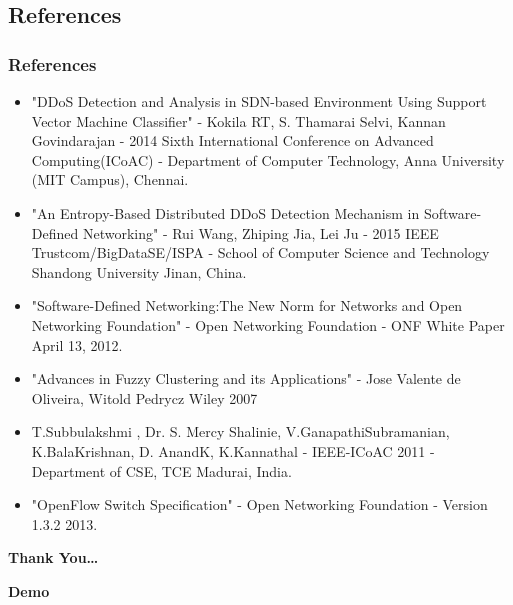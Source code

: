 \documentclass[10pt]{beamer}
\begin{document}
\begin{frame}
\section[]{References}
\frametitle{References}
\begin{itemize}
\footnotesize
\item
"DDoS Detection and Analysis in SDN-based Environment Using Support Vector Machine Classifier" - Kokila RT, S. Thamarai Selvi, Kannan Govindarajan - 2014 Sixth International Conference on Advanced Computing(ICoAC) - Department of Computer Technology, Anna University (MIT Campus), Chennai.

\item
"An Entropy-Based Distributed DDoS Detection Mechanism in Software-Defined Networking" - Rui Wang, Zhiping Jia, Lei Ju - 2015 IEEE Trustcom/BigDataSE/ISPA - School of Computer Science and Technology Shandong University Jinan, China.

\item
"Software-Defined Networking:The New Norm for Networks and 
Open Networking Foundation" - Open Networking Foundation - ONF White Paper April 13, 2012.

\item
"Advances in Fuzzy Clustering and its Applications" -
Jose Valente de Oliveira, Witold Pedrycz
Wiley 2007

\item
T.Subbulakshmi , Dr. S. Mercy Shalinie, V.GanapathiSubramanian, K.BalaKrishnan, D. AnandK, K.Kannathal - IEEE-ICoAC 2011 - Department of CSE, TCE Madurai, India.

\item
"OpenFlow Switch Specification" - Open Networking Foundation - Version 1.3.2 2013.

\end{itemize}
\end{frame}

\begin{frame}{}
\Huge
\centering
\textbf{Thank You\ldots}
\end{frame}

\begin{frame}{}
\Huge
\centering
\textbf{Demo}
\end{frame}
\end{document}

